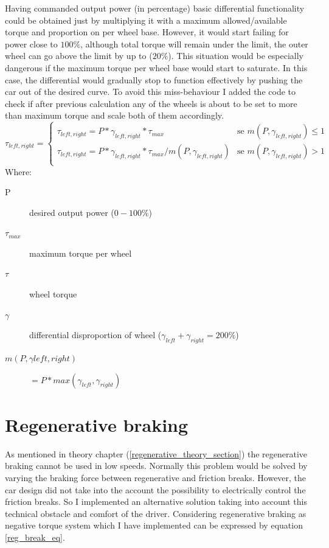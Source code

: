 Having commanded output power (in percentage) basic differential functionality could be obtained just by multiplying it with a maximum allowed/available torque and proportion on per wheel base. However, it would start failing for power close to $100\% $, although total torque will remain under the limit, the outer wheel can go above the limit by up to ($20\% $).
This situation would be especially dangerous if the maximum torque per wheel base would start to saturate. In this case, the differential would gradually stop to function effectively by pushing the car out of the desired curve.
To avoid this miss-behaviour I added the code to check if after previous calculation any of the wheels is about to be set to more than maximum torque and scale both of them accordingly.
\begin{equation}\label{diff_saf}
    \tau_{left,right} = \begin{cases}
        \tau_{left,right} = P * \gamma_{left,right} * \tau_{max} & \text{se $m(P,\gamma_{left,right}) \leq 1$}\\
        \tau_{left,right} = P * \gamma_{left,right} * \tau_{max} / m(P,\gamma_{left,right}) & \text{se $m(P,\gamma_{left,right}) > 1$}\\
    \end{cases}
\end{equation}
Where:
\begin{description}
    \item[P] desired output power ($0-100\%$)
    \item[$\tau_{max}$] maximum torque per wheel
    \item[$\tau$] wheel torque
    \item[$\gamma$] differential disproportion of wheel ($\gamma_{left}+\gamma_{right}=200\%$)
    \item[$m(P,\gamma{left,right})$] $= P * max(\gamma_{left},\gamma_{right})$
\end{description}

\section{Regenerative braking}
As mentioned in theory chapter (\ref{regenerative_theory_section}) the regenerative braking cannot be used in low speeds. Normally this problem would be solved by varying the braking force between regenerative and friction breaks. However, the car design did not take into the account the possibility to electrically control the friction breaks. So I implemented an alternative solution taking into account this technical obstacle and comfort of the driver.
Considering regenerative braking as negative torque system which I have implemented can be expressed by equation \ref{reg_break_eq}.


